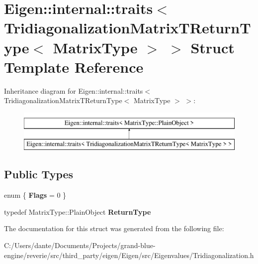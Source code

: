 \hypertarget{struct_eigen_1_1internal_1_1traits_3_01_tridiagonalization_matrix_t_return_type_3_01_matrix_type_01_4_01_4}{}\section{Eigen\+::internal\+::traits$<$ Tridiagonalization\+Matrix\+T\+Return\+Type$<$ Matrix\+Type $>$ $>$ Struct Template Reference}
\label{struct_eigen_1_1internal_1_1traits_3_01_tridiagonalization_matrix_t_return_type_3_01_matrix_type_01_4_01_4}
Inheritance diagram for Eigen\+::internal\+::traits$<$ Tridiagonalization\+Matrix\+T\+Return\+Type$<$ Matrix\+Type $>$ $>$\+:\begin{figure}[H]
\begin{center}
\leavevmode
\includegraphics[height=2.000000cm]{struct_eigen_1_1internal_1_1traits_3_01_tridiagonalization_matrix_t_return_type_3_01_matrix_type_01_4_01_4}
\end{center}
\end{figure}
\subsection*{Public Types}
\begin{DoxyCompactItemize}
\item 
\mbox{\label{struct_eigen_1_1internal_1_1traits_3_01_tridiagonalization_matrix_t_return_type_3_01_matrix_type_01_4_01_4_a7d612501dcc56cba7c592550e95b987b}} 
enum \{ {\bfseries Flags} = 0
 \}
\item 
\mbox{\label{struct_eigen_1_1internal_1_1traits_3_01_tridiagonalization_matrix_t_return_type_3_01_matrix_type_01_4_01_4_ac98c68554cfb85855f7b85299983aec9}} 
typedef Matrix\+Type\+::\+Plain\+Object {\bfseries Return\+Type}
\end{DoxyCompactItemize}


The documentation for this struct was generated from the following file\+:\begin{DoxyCompactItemize}
\item 
C\+:/\+Users/dante/\+Documents/\+Projects/grand-\/blue-\/engine/reverie/src/third\+\_\+party/eigen/\+Eigen/src/\+Eigenvalues/Tridiagonalization.\+h\end{DoxyCompactItemize}
